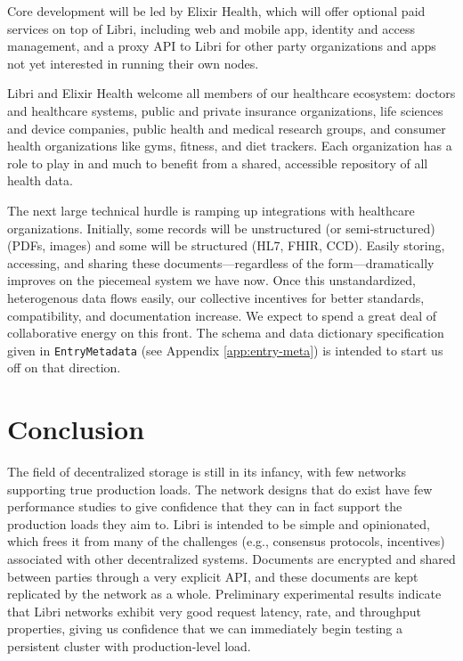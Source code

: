 \documentclass[10pt]{article}
\newcommand{\ttt}[1]{\texttt{#1}}
\begin{document}
Core development will be led by Elixir Health, which will offer optional paid services on top of Libri, including web and mobile app, identity and access management, and a proxy API to Libri for other  party organizations and apps not yet interested in running their own nodes.

Libri and Elixir Health welcome all members of our healthcare ecosystem: doctors and healthcare systems, public and private insurance organizations, life sciences and device companies, public health and medical research groups, and consumer health organizations like gyms, fitness, and diet trackers. Each organization has a role to play in and much to benefit from a shared, accessible repository of all health data.

The next large technical hurdle is ramping up integrations with healthcare organizations. Initially, some records will be unstructured (or semi-structured) (PDFs, images) and some will be structured (HL7, FHIR, CCD). Easily storing, accessing, and sharing these documents---regardless of the form---dramatically improves on the piecemeal system we have now. Once this unstandardized, heterogenous data flows easily, our collective incentives for better standards, compatibility, and documentation increase. We expect to spend a great deal of collaborative energy on this front. The schema and data dictionary specification given in \ttt{EntryMetadata} (see Appendix \ref{app:entry-meta}) is intended to start us off on that direction. 

\section{Conclusion}
The field of decentralized storage is still in its infancy, with few networks supporting true production loads. The network designs that do exist have few performance studies to give confidence that they can in fact support the production loads they aim to. Libri is intended to be simple and opinionated, which frees it from many of the challenges (e.g., consensus protocols, incentives) associated with other decentralized systems. Documents are encrypted and shared between parties through a very explicit API, and these documents are kept replicated by the network as a whole. Preliminary experimental results indicate that Libri networks exhibit very good request latency, rate, and throughput properties, giving us confidence that we can immediately begin testing a persistent cluster with production-level load. 
\end{document}

